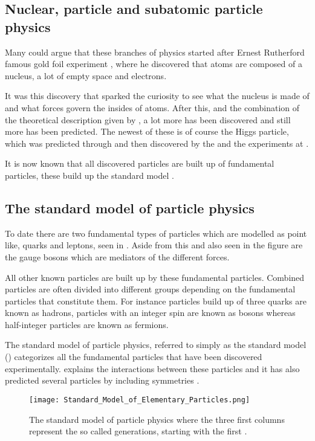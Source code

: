 \subsection{Nuclear, particle and subatomic particle physics}\label{sec:tb:subsec:nps}
Many could argue that these branches of physics started after Ernest Rutherford famous gold foil experiment \citep{Burchan:1995}, where he discovered that atoms are composed of a nucleus, a lot of empty space and electrons. 

It was this discovery that sparked the curiosity to see what the nucleus is made of and what forces govern the insides of atoms. After this, and the combination of the theoretical description given by \abbrQM, a lot more has been discovered and still more has been predicted. The newest of these is of course the Higgs particle, which was predicted through \abbrQFT and then discovered by the \abbrATLAS and the \abbrCMS experiments at \abbrCERN \citep{Higgs:2012, Chatrchyan:2012}. 

It is now known that all discovered particles are built up of fundamental particles, these build up the standard model \citep{Burchan:1995}.
\subsection{The standard model of particle physics}\label{sec:tb:subsec:SM}
To date there are two fundamental types of particles which are modelled as point like, quarks and leptons, seen in . Aside from this and also seen in the figure are the gauge bosons which are mediators of the different forces.

All other known particles are built up by these fundamental particles. Combined particles are often divided into different groups depending on the fundamental particles that constitute them. For instance particles build up of three quarks are known as hadrons, particles with an integer spin are known as bosons whereas half-integer particles are known as fermions.

The standard model of particle physics, referred to simply as the standard model (\abbrSM) categorizes all the fundamental particles that have been discovered experimentally. \abbrQFT explains the interactions between these particles and it has also predicted several particles by including symmetries \citep{Burchan:1995}.
\begin{figure}[h]
 \centering
\texttt{[image: Standard\_Model\_of\_Elementary\_Particles.png]}
  \caption{{\small The standard model of particle physics where the three first columns represent the so called generations, starting with the first \citep{wiki1}.}}
    \label{fig:SM}
\end{figure}

